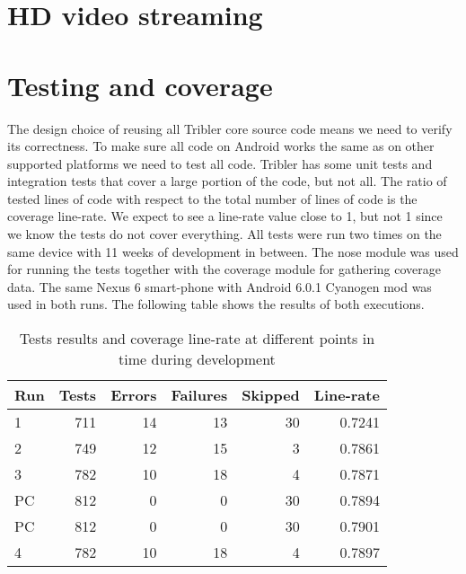 \section{HD video streaming}


\section{Testing and coverage}
The design choice of reusing all Tribler core source code means we need to verify its correctness.
To make sure all code on Android works the same as on other supported platforms we need to test all code.
Tribler has some unit tests and integration tests that cover a large portion of the code, but not all.
The ratio of tested lines of code with respect to the total number of lines of code is the coverage line-rate.
We expect to see a line-rate value close to 1, but not 1 since we know the tests do not cover everything.
All tests were run two times on the same device with 11 weeks of development in between.
The nose module was used for running the tests together with the coverage module for gathering coverage data.
The same Nexus 6 smart-phone with Android 6.0.1 Cyanogen mod was used in both runs.
The following table shows the results of both executions.
\begin{table}
	\begin{tabular}{l | *{5}{r}} \hline
		Run & Tests & Errors & Failures & Skipped & Line-rate \\ \hline \hline
		1     & 711   & 14       & 13          & 30          & 0.7241 \\ \hline
		2     & 749   & 12       & 15          & 3            & 0.7861 \\ \hline
		3	  & 782	  & 10		 & 18		   & 4			  & 0.7871 \\ \hline
		PC   & 812   & 0         & 0            & 30          & 0.7894 \\ \hline
		PC   & 812   & 0         & 0            & 30          & 0.7901 \\ \hline
		4     & 782   & 10       & 18          & 4            & 0.7897 \\ \hline
	\end{tabular}
	\caption{Tests results and coverage line-rate at different points in time during development}
	\label{table:testing_coverage}
\end{table}

